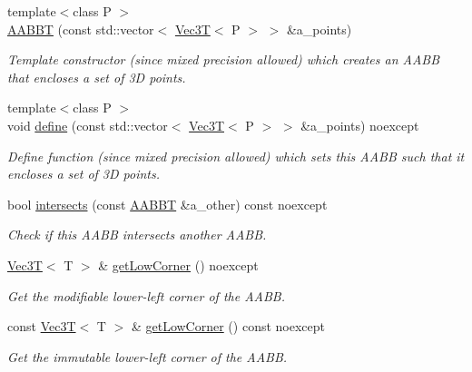 \begin{DoxyCompactItemize}
{\footnotesize template$<$class P $>$ }\\\hyperlink{classBoundingVolumes_1_1AABBT_ab58be0cf4a32b502fdd1aedb7ba11587}{A\+A\+B\+BT} (const std\+::vector$<$ \hyperlink{classVec3T}{Vec3T}$<$ P $>$ $>$ \&a\+\_\+points)
\begin{DoxyCompactList}\small\item\em Template constructor (since mixed precision allowed) which creates an A\+A\+BB that encloses a set of 3D points. \end{DoxyCompactList}\item 
{\footnotesize template$<$class P $>$ }\\void \hyperlink{classBoundingVolumes_1_1AABBT_a5ff57720a5d6511642ce39a09a7b7663}{define} (const std\+::vector$<$ \hyperlink{classVec3T}{Vec3T}$<$ P $>$ $>$ \&a\+\_\+points) noexcept
\begin{DoxyCompactList}\small\item\em Define function (since mixed precision allowed) which sets this A\+A\+BB such that it encloses a set of 3D points. \end{DoxyCompactList}\item 
bool \hyperlink{classBoundingVolumes_1_1AABBT_a87d160a3e05082e34e37d8b4472bad7d}{intersects} (const \hyperlink{classBoundingVolumes_1_1AABBT}{A\+A\+B\+BT} \&a\+\_\+other) const noexcept
\begin{DoxyCompactList}\small\item\em Check if this A\+A\+BB intersects another A\+A\+BB. \end{DoxyCompactList}\item 
\mbox{\label{classBoundingVolumes_1_1AABBT_a6368509e66a2b5691272f273fe96f670}} 
\hyperlink{classVec3T}{Vec3T}$<$ T $>$ \& \hyperlink{classBoundingVolumes_1_1AABBT_a6368509e66a2b5691272f273fe96f670}{get\+Low\+Corner} () noexcept
\begin{DoxyCompactList}\small\item\em Get the modifiable lower-\/left corner of the A\+A\+BB. \end{DoxyCompactList}\item 
\mbox{\label{classBoundingVolumes_1_1AABBT_a937cfc6cbbbd457f872370c1c4d5e81e}} 
const \hyperlink{classVec3T}{Vec3T}$<$ T $>$ \& \hyperlink{classBoundingVolumes_1_1AABBT_a937cfc6cbbbd457f872370c1c4d5e81e}{get\+Low\+Corner} () const noexcept
\begin{DoxyCompactList}\small\item\em Get the immutable lower-\/left corner of the A\+A\+BB. \end{DoxyCompactList}\item 

\end{DoxyCompactItemize}
